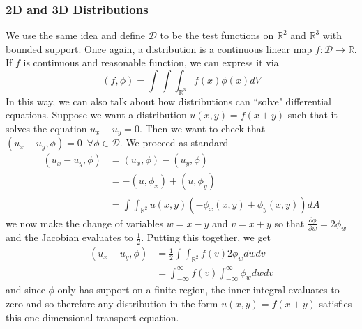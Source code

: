 \documentclass{article}
\newcommand{\R}{\mathbb{R}}
\newcommand{\pd}[2]{\frac{\partial #1}{\partial #2}}
\theoremstyle{definition}
\begin{document}
\subsubsection{2D and 3D Distributions}
We use the same idea and define $\mathcal{D}$ to be the test functions on $\R^2$ and $\R^3$ with bounded support. Once again, a distribution is a continuous linear map $f:\mathcal{D} \to \R$. If $f$ is continuous and reasonable function, we can express it via 
\begin{equation*}
    (f,\phi) = \int \!\!\! \int \!\!\! \int_{\R^3} f(x) \phi (x) dV
\end{equation*}
In this way, we can also talk about how distributions can ``solve" differential equations. Suppose we want a distribution $u(x,y)=f(x+y)$ such that it solves the equation $u_x-u_y=0$. Then we want to check that $(u_x-u_y,\phi) = 0 \,\,\, \forall \phi \in \mathcal{D}$. We proceed as standard 
\begin{equation*}
    \begin{split}
        (u_x-u_y,\phi) &= (u_x,\phi)-(u_y,\phi) \\
        &= -(u,\phi_x) + (u,\phi_y) \\
        &= \int\!\!\!\int_{\R^2} u(x,y)(-\phi_x (x,y)+\phi_y(x,y))dA
    \end{split}
\end{equation*}
we now make the change of variables $w=x-y $ and $v= x+y$ so that $\pd{\phi}{w} = 2\phi_w$ and the Jacobian evaluates to $\frac{1}{2}$. Putting this together, we get 
\begin{equation*}
    \begin{split}
        (u_x-u_y,\phi) &= \frac{1}{2}\int \!\!\! \int_{\R^2} f(v) 2\phi_w dw dv \\
        &= \int^\infty_{-\infty} f(v) \int^\infty_{-\infty} \phi_w dw dv 
    \end{split}
\end{equation*}
and since $\phi$ only has support on a finite region, the inner integral evaluates to zero and so therefore any distribution in the form $u(x,y) = f(x+y)$ satisfies this one dimensional transport equation.
\end{document}
